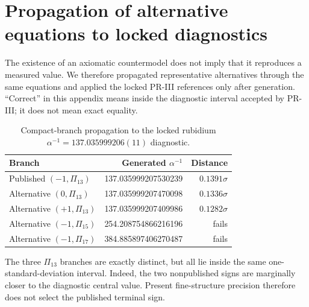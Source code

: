\section{Propagation of alternative equations to locked diagnostics}
\label{app:alternative-propagation}

The existence of an axiomatic countermodel does not imply that it reproduces a
measured value.  We therefore propagated representative alternatives through
the same equations and applied the locked PR-III references only after
generation.  ``Correct'' in this appendix means inside the diagnostic interval
accepted by PR-III; it does not mean exact equality.

\begin{table}[H]
\centering
\small
\caption{Compact-branch propagation to the locked rubidium
$\alpha^{-1}=137.035999206(11)$ diagnostic.}
\label{tab:compact-diagnostic-propagation}
\begin{tabular}{@{}lrr@{}}
\toprule
Branch & Generated $\alpha^{-1}$ & Distance \\
\midrule
Published $(-1,\Pi_{13})$ & 137.035999207530239 & $0.1391\sigma$ \\
Alternative $(0,\Pi_{13})$ & 137.035999207470098 & $0.1336\sigma$ \\
Alternative $(+1,\Pi_{13})$ & 137.035999207409986 & $0.1282\sigma$ \\
Alternative $(-1,\Pi_{15})$ & 254.208754866216196 & fails \\
Alternative $(-1,\Pi_{17})$ & 384.885897406270487 & fails \\
\bottomrule
\end{tabular}
\end{table}

The three $\Pi_{13}$ branches are exactly distinct, but all lie inside the same
one-standard-deviation interval.  Indeed, the two nonpublished signs are
marginally closer to the diagnostic central value.  Present fine-structure
precision therefore does not select the published terminal sign.

